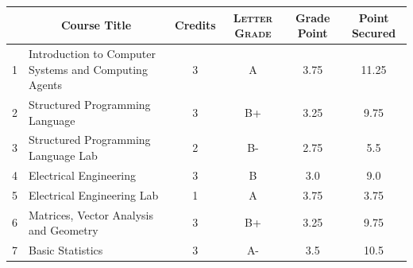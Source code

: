 \documentclass[11pt]{article}
\newcommand*{\numtwo}[1]{\pgfmathprintnumber[
                    fixed, precision=2, fixed zerofill=true]{#1}}
\begin{document}
                \begin{center}
                    \renewcommand{\arraystretch}{1.08}
                    
                \begin{tabular}{|c|l|c|>{\scshape}c|c|c|}
                \hline  \rule[-1ex]{0pt}{3.5ex} {\centering{\bf Course Code}} &  \multicolumn{1}{c|}{\textbf{Course Title}}  & {\bf Credits} & {\bf Letter Grade} & {\bf Grade Point} & {\bf Point Secured}  \\ 
                \hline   1 &  Introduction to Computer Systems and Computing Agents		 & 3 & A & 3.75 & 11.25 \\ %
                \hline   2 &  Structured Programming Language		 & 3 & B+ & 3.25 & 9.75 \\ %
                \hline   3 &  Structured Programming Language Lab		 & 2 & B- & 2.75 & 5.5 \\ %
                \hline   4 &  Electrical Engineering		 & 3 & B & 3.0 & 9.0 \\ %
                \hline   5 &  Electrical Engineering Lab		 & 1 & A & 3.75 & 3.75 \\ %
                \hline   6 &  Matrices, Vector Analysis and Geometry		 & 3 & B+ & 3.25 & 9.75 \\ %
                \hline   7 &  Basic Statistics		 & 3 & A- & 3.5 & 10.5 \\ %

\hline                %
                \end{tabular}
                \end{center}
                \renewcommand{\arraystretch}{1.03}
\end{document}
